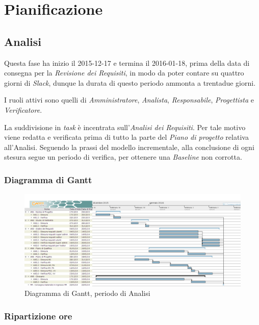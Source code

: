 \section{Pianificazione}
\subsection{Analisi}
Questa fase ha inizio il 2015-12-17 e termina il 2016-01-18, prima della data di consegna per la \textit{Revisione dei Requisiti}, in modo da poter contare su quattro giorni di \textit{Slack}, dunque la durata di questo periodo ammonta a trentadue giorni.

I ruoli attivi sono quelli di \textit{Amministratore}, \textit{Analista}, \textit{Responsabile}, \textit{Progettista} e \textit{Verificatore}.

La suddivisione in \textit{task} \`e incentrata sull'\textit{Analisi dei Requisiti}. Per tale motivo viene redatta e verificata prima di tutto la parte del \textit{Piano di progetto} relativa all'Analisi. Seguendo la prassi del modello incrementale, alla conclusione di ogni stesura segue un periodo di verifica, per ottenere una \textit{Baseline} non corrotta.
\subsubsection{Diagramma di Gantt}
\begin{figure}[ht!]
\includegraphics[width=1\textwidth]{res/img/pianificazione/Analisi.png}
\caption{Diagramma di Gantt, periodo di Analisi}
\end{figure}

\subsubsection{Ripartizione ore}

